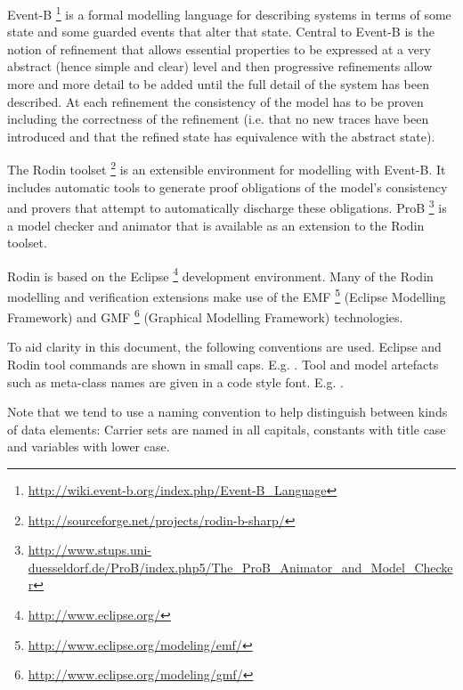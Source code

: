 Event-B%
\footnote{%
  \url{http://wiki.event-b.org/index.php/Event-B_Language}
} %
is a formal modelling language for describing systems in terms of some state and some guarded events that alter that state. Central to Event-B is the notion of refinement that allows essential properties to be expressed at a very abstract (hence simple and clear) level and then progressive refinements allow more and more detail to be added until the full detail of the system has been described. At each refinement the consistency of the model has to be proven including the correctness of the refinement (i.e. that no new traces have been introduced and that the refined state has equivalence with the abstract state).

The Rodin toolset%
\footnote{%
  \url{http://sourceforge.net/projects/rodin-b-sharp/}
} %
is an extensible environment for modelling with Event-B. It includes automatic tools to generate proof obligations of the model’s consistency and provers that attempt to automatically discharge these obligations. ProB%
\footnote{%
  \url{http://www.stups.uni-duesseldorf.de/ProB/index.php5/The_ProB_Animator_and_Model_Checker}
} %
is a model checker and animator that is available as an extension to the Rodin toolset.

Rodin is based on the Eclipse%
\footnote{%
  \url{http://www.eclipse.org/}
} %
development environment. Many of the Rodin modelling and verification extensions make use of the EMF%
\footnote{%
  \url{http://www.eclipse.org/modeling/emf/}
} %
(Eclipse Modelling Framework) and GMF%
\footnote{%
  \url{http://www.eclipse.org/modeling/gmf/}
} %
(Graphical Modelling Framework) technologies.

To aid clarity in this document, the following conventions are used. 
Eclipse and Rodin tool commands are shown in small caps. E.g. .
Tool and model artefacts such as meta-class names are given in a code style font. E.g. .

Note that we tend to use a naming convention to help distinguish between kinds of data elements: Carrier sets are named in all capitals, constants with title case and variables with lower case.

